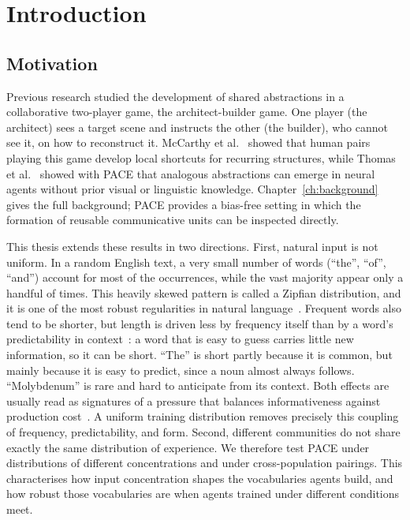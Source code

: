 \chapter{Introduction}
\label{ch:introduction}

\section{Motivation}
\label{sec:intro-motivation}

Previous research studied the development of shared abstractions in a collaborative two-player game, the architect-builder game. One player (the architect) sees a target scene and instructs the other (the builder), who cannot see it, on how to reconstruct it. McCarthy et al.~\cite{mccarthy_learning_2021} showed that human pairs playing this game develop local shortcuts for recurring structures, while Thomas et al.~\cite{thomas_pace_2025} showed with PACE that analogous abstractions can emerge in neural agents without prior visual or linguistic knowledge. Chapter~\ref{ch:background} gives the full background; PACE provides a bias-free setting in which the formation of reusable communicative units can be inspected directly.

This thesis extends these results in two directions. First, natural input is not uniform. In a random English text, a very small number of words (``the'', ``of'', ``and'') account for most of the occurrences, while the vast majority appear only a handful of times. This heavily skewed pattern is called a Zipfian distribution, and it is one of the most robust regularities in natural language~\cite{zipf_human_1949}. Frequent words also tend to be shorter, but length is driven less by frequency itself than by a word's predictability in context~\cite{piantadosi_word_2011}: a word that is easy to guess carries little new information, so it can be short. ``The'' is short partly because it is common, but mainly because it is easy to predict, since a noun almost always follows. ``Molybdenum'' is rare and hard to anticipate from its context. Both effects are usually read as signatures of a pressure that balances informativeness against production cost~\cite{gibson_how_2019}. A uniform training distribution removes precisely this coupling of frequency, predictability, and form. Second, different communities do not share exactly the same distribution of experience. We therefore test PACE under distributions of different concentrations and under cross-population pairings. This characterises how input concentration shapes the vocabularies agents build, and how robust those vocabularies are when agents trained under different conditions meet.

